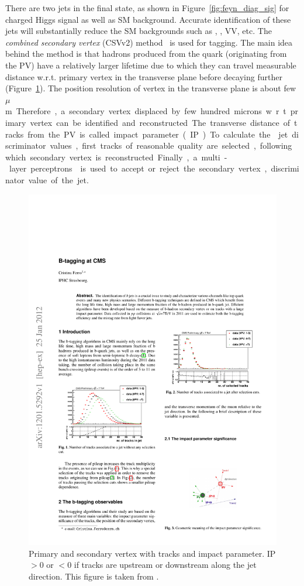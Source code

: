 There are two \PQb jets in the final state, as shown in Figure~\ref{fig:feyn_diag_sig} for charged 
Higgs signal as well as SM \ttjets background.
Accurate identification of these \PQb jets will substantially reduce the SM backgrounds such as 
\wjets, \dyjets, VV, etc. The {\em combined secondary vertex} (CSVv2) method~\cite{Chatrchyan:2012jua} 
is used for \PQb tagging. The main idea behind the method is that \PQb hadrons produced from the 
\PQb quark (originating from the PV) have a relatively larger lifetime due to which they can travel 
measurable distance w.r.t. primary vertex in the transverse plane before decaying further 
(Figure~\ref{fig:bCSV}). The position resolution of vertex in the transverse plane is about few 
\unit{$\mu$m}. Therefore, a secondary vertex displaced by few hundred microns w.r.t. primary vertex 
can be identified and reconstructed. The transverse distance of tracks from the PV is called impact 
parameter (IP). To calculate the \PQb jet discriminator values, first tracks of reasonable quality 
are selected, following which secondary vertex is reconstructed. Finally, a multi-layer perceptrons
\cite{CMS-PAS-BTV-15-001} is used to accept or reject the secondary vertex, discriminator value of 
the jet.
\begin{figure}
\centering
\includegraphics[width=0.50\linewidth]{Image/bCSV.pdf}
\caption{ Primary and secondary vertex with tracks and impact parameter. IP $> 0$ or $< 0$ if tracks
are upstream or downstream along the jet direction. This figure is taken from \cite{Ferro:2012tg}.} 
\label{fig:bCSV}
\end{figure}

